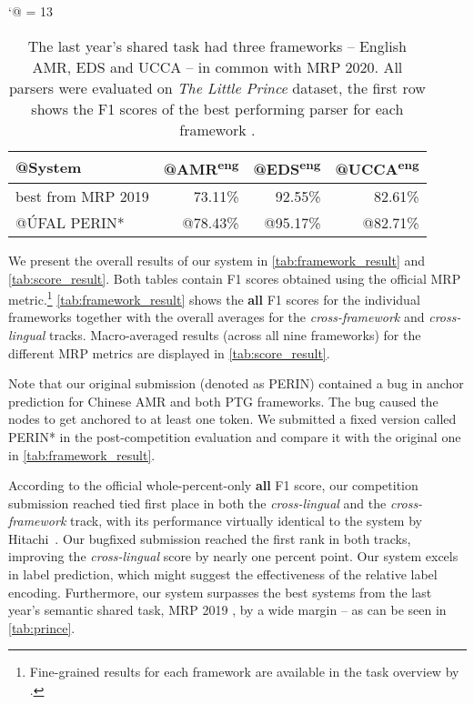 \documentclass[11pt,a4paper]{article}
\begin{document}
\begin{table}[t]
\small
\centering
\catcode`@ = 13
\begin{tabular}{@{}lrrr@{}}
\toprule
@System          & @AMR\textsuperscript{eng} & @EDS\textsuperscript{eng} & @UCCA\textsuperscript{eng} \\ \midrule
best from MRP 2019 &  73.11\% &  92.55\% &  82.61\% \\
@ÚFAL PERIN*          & @78.43\% & @95.17\% & @82.71\% \\ \bottomrule
\end{tabular}
\caption{The last year's shared task had three frameworks -- English AMR, EDS and UCCA -- in common with MRP 2020. All parsers were evaluated on \emph{The Little Prince} dataset, the first row shows the F1 scores of the best performing parser for each framework \cite{Oep:Abe:Haj:19}.}
\label{tab:prince}
\end{table}

We present the overall results of our system in \autoref{tab:framework_result} and \autoref{tab:score_result}. Both tables contain F1 scores obtained using the official MRP metric.\hspace{-.08em}\footnote{Fine-grained results for each framework are available in the task overview by \citet{Oep:Abe:Abz:20}.} \autoref{tab:framework_result} shows the \textbf{all} F1 scores for the individual frameworks together with the overall averages for the \emph{cross-framework} and \emph{cross-lingual} tracks. Macro-averaged results (across all nine frameworks) for the different MRP metrics are displayed in \autoref{tab:score_result}.

Note that our original submission (denoted as PERIN) contained a bug in anchor prediction for Chinese AMR and both PTG frameworks. The bug caused the nodes to get anchored to at least one token. We submitted a fixed version called PERIN* in the post-competition evaluation and compare it with the original one in \autoref{tab:framework_result}.

According to the official whole-percent-only \textbf{all} F1 score, our competition submission reached tied first place in both the \emph{cross-lingual} and the \emph{cross-framework} track, with its performance virtually identical to the system by Hitachi~\cite{Oza:Mor:Kor:20}. Our bugfixed submission reached the first rank in both tracks, improving the \emph{cross-lingual} score by nearly one percent point. Our system excels in label prediction, which might suggest the effectiveness of the relative label encoding. Furthermore, our system surpasses the best systems from the last year's semantic shared task, MRP 2019 \cite{Oep:Abe:Haj:19}, by a wide margin -- as can be seen in \autoref{tab:prince}. 
\end{document}
